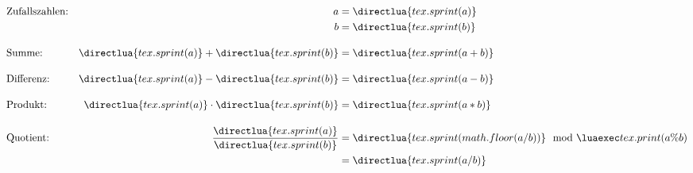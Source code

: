 \documentclass[fontsize=12pt]{scrartcl}
\newcommand{\lprint}[1]{\directlua{tex.sprint(#1)}}
\begin{document}
	\begin{align*}
		&\text{Zufallszahlen:} &
			a &=\lprint{a}\\
			&& b &=\lprint{b}\\[1em]
		&\text{Summe:} &
			\lprint{a}+\lprint{b} &= \lprint{a+b}\\[1em]
		&\text{Differenz:} &
			\lprint{a}-\lprint{b} &=\lprint{a-b}\\[1em]
		&\text{Produkt:} &
			\lprint{a}\cdot\lprint{b} &= \lprint{a*b}\\[1em]
		&\text{Quotient:} &
			\frac{\lprint{a}}{\lprint{b}} 
			&= \lprint{math.floor(a/b)}\mod \luaexec{tex.print(a\%b)}\\
			&&&= \lprint{a/b}
	\end{align*}
\end{document}
